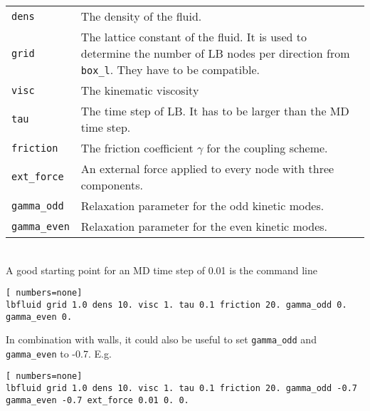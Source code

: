 \begin{tabular}{p{}p{}}
\lstinline|dens| & The density of the fluid.\\
\lstinline|grid| & The lattice constant of the fluid. It is used to determine the number of LB nodes 
per direction from \lstinline|box_l|. They have to be compatible. \\
\lstinline|visc| & The kinematic viscosity \\
\lstinline|tau| & The time step of LB. It has to be larger than the MD time step. \\
\lstinline|friction| & The friction coefficient $\gamma$ for the coupling scheme. \\
\lstinline|ext_force| & An external force applied to every node with three components. \\
\lstinline|gamma_odd| & Relaxation parameter for the odd kinetic modes. \\
\lstinline|gamma_even| & Relaxation parameter for the even kinetic modes.
\end{tabular} \\

A good starting point for an MD time step of 0.01 is the command line
\vspace{0,2cm}
\begin{lstlisting}[ numbers=none]
lbfluid grid 1.0 dens 10. visc 1. tau 0.1 friction 20. gamma_odd 0. gamma_even 0.
\end{lstlisting}
\vspace{0,2cm}

In combination with walls, it could also be useful to set \lstinline|gamma_odd| and
\lstinline|gamma_even| to -0.7. E.g. 
\vspace{0,2cm}
\begin{lstlisting}[ numbers=none]
lbfluid grid 1.0 dens 10. visc 1. tau 0.1 friction 20. gamma_odd -0.7 gamma_even -0.7 ext_force 0.01 0. 0.
\end{lstlisting}
\vspace{0,2cm}

